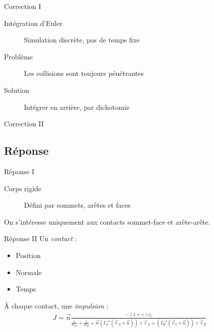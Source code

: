 \documentclass{beamer}
\begin{document}
\begin{frame}{Correction I}
  \begin{description}
  \item[Intégration d'Euler] Simulation discrète, pas de temps fixe
  \item[Problème] Les collisions sont toujours pénétrantes
  \end{description}

  \vfill

  \begin{figure}
    \centering
    
  \end{figure}

  \vfill

  \begin{description}
  \item[Solution] Intégrer en arrière, par dichotomie
  \end{description}
\end{frame}

\begin{frame}{Correction II}
  \begin{figure}
    \centering
    
  \end{figure}
\end{frame}

\subsection{Réponse}

\begin{frame}{Réponse I}
  \begin{description}
  \item[Corps rigide] Défini par sommets, arêtes et faces
  \end{description}
  
  \vfill

  On s'intéresse uniquement aux contacts sommet-face et arête-arête.

  \vfill

  \begin{figure}
    \centering
    
    
  \end{figure}
\end{frame}

\begin{frame}{Réponse II}
  Un \textit{contact} :
  \begin{itemize}
  \item Position
  \item Normale
  \item Temps
  \end{itemize}

  \vfill

  \`A chaque contact, une \textit{impulsion} :
  \begin{align*}
    J = \vec{n} 
    \frac{-(1 + \varepsilon) v_r}{
      \frac{1}{m_A} +
      \frac{1}{m_B} +
      \vec{n}
      (I_A^{-1} (\vec{r}_A \times \vec{n})) \times \vec{r}_A +
      (I_B^{-1} (\vec{r}_b \times \vec{n})) \times \vec{r}_B
    }
  \end{align*}
\end{frame}
\end{document}
